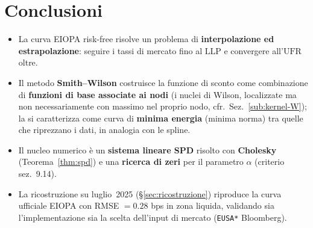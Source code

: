 \documentclass[11pt,a4paper]{article}
\theoremstyle{plain}
\theoremstyle{definition}
\theoremstyle{remark}
\newcommand{\UFR}{\ensuremath{\mathrm{UFR}}}
\newcommand{\LLP}{\ensuremath{\mathrm{LLP}}}
\begin{document}
\section{Conclusioni}

\begin{itemize}
  \item La curva EIOPA risk-free risolve un problema di \textbf{interpolazione ed
        estrapolazione}: seguire i tassi di mercato fino al $\LLP$ e convergere all'$\UFR$ oltre.
  \item Il metodo \textbf{Smith--Wilson} costruisce la funzione di sconto come combinazione di
        \textbf{funzioni di base associate ai nodi} (i nuclei di Wilson, localizzate ma non
        necessariamente con massimo nel proprio nodo, cfr.~Sez.~\ref{sub:kernel-W}); la si
        caratterizza come curva di \textbf{minima energia} (minima norma) tra quelle che
        riprezzano i dati, in analogia con le spline.
  \item Il nucleo numerico \`e un \textbf{sistema lineare SPD} risolto con \textbf{Cholesky}
        (Teorema~\ref{thm:spd}) e una \textbf{ricerca di zeri} per il parametro $\alpha$
        (criterio sez.~9.14).
  \item La ricostruzione su luglio~2025 (§\ref{sec:ricostruzione}) riproduce la curva ufficiale
        EIOPA con RMSE $= 0.28$ bps in zona liquida, validando sia l'implementazione sia la
        scelta dell'input di mercato (\texttt{EUSA*} Bloomberg).
\end{itemize}
\end{document}
